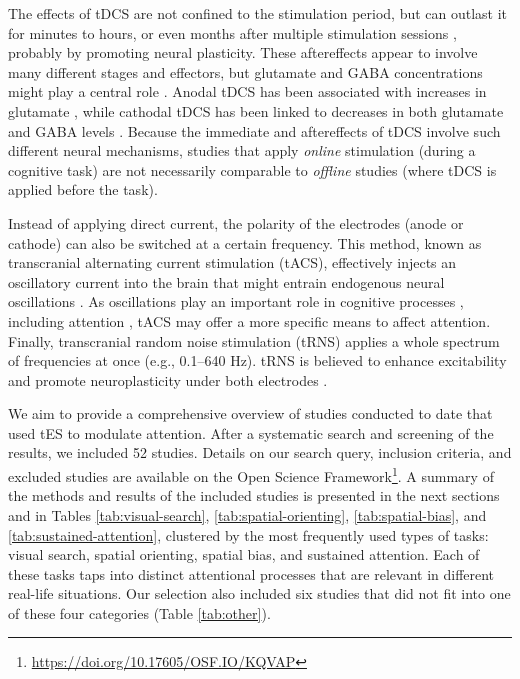 \documentclass[11pt,]{memoir}
\let\rmarkdownfootnote\footnote%
\def\footnote{\protect\rmarkdownfootnote}
\renewcommand{\href}[2]{#2\footnote{\url{#1}}} %
\begin{document}
The effects of tDCS are not confined to the stimulation period, but can outlast it for minutes to hours, or even months after multiple stimulation sessions \autocite{Snowball2013}, probably by promoting neural plasticity. These aftereffects appear to involve many different stages and effectors, but glutamate and GABA concentrations might play a central role \autocite{Stagg2011b}. Anodal tDCS has been associated with increases in glutamate \autocites{Clark2011}{Hone-Blanchet2016}, while cathodal tDCS has been linked to decreases in both glutamate and GABA levels \autocite{Stagg2009}. Because the immediate and aftereffects of tDCS involve such different neural mechanisms, studies that apply \emph{online} stimulation (during a cognitive task) are not necessarily comparable to \emph{offline} studies (where tDCS is applied before the task).

Instead of applying direct current, the polarity of the electrodes (anode or cathode) can also be switched at a certain frequency. This method, known as transcranial alternating current stimulation (tACS), effectively injects an oscillatory current into the brain that might entrain endogenous neural oscillations \autocite{Herrmann2013}. As oscillations play an important role in cognitive processes \autocites{Buzsaki2004d}{Siegel2010c}, including attention \autocites{Buschman2007}{Womelsdorf2007}, tACS may offer a more specific means to affect attention. Finally, transcranial random noise stimulation (tRNS) applies a whole spectrum of frequencies at once (e.g., 0.1--640 Hz). tRNS is believed to enhance excitability and promote neuroplasticity under both electrodes \autocites{Antal2016}{Terney2008}.

We aim to provide a comprehensive overview of studies conducted to date that used tES to modulate attention. After a systematic search and screening of the results, we included 52 studies. Details on our search query, inclusion criteria, and excluded studies are available on the \href{https://doi.org/10.17605/OSF.IO/KQVAP}{Open Science Framework}. A summary of the methods and results of the included studies is presented in the next sections and in Tables \ref{tab:visual-search}, \ref{tab:spatial-orienting}, \ref{tab:spatial-bias}, and \ref{tab:sustained-attention}, clustered by the most frequently used types of tasks: visual search, spatial orienting, spatial bias, and sustained attention. Each of these tasks taps into distinct attentional processes that are relevant in different real-life situations. Our selection also included six studies that did not fit into one of these four categories (Table \ref{tab:other}).
\end{document}
